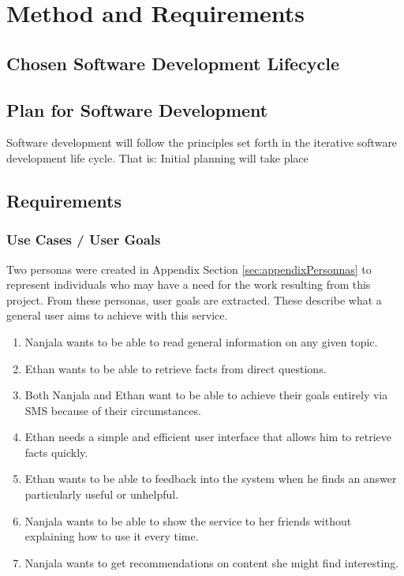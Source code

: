 \documentclass{article}
\begin{document}
\newpage
\section{Method and Requirements}
\label{sec:method}

\subsection{Chosen Software Development Lifecycle}

\subsection{Plan for Software Development}
Software development will follow the principles set forth in the iterative software development life cycle.  That is: Initial planning will take place 

\subsection{Requirements}

\subsubsection{Use Cases / User Goals}
Two personas were created in Appendix Section \ref{sec:appendixPersonnas} to represent individuals who may have a need for the work resulting from this project.  From these personas, user goals are extracted.  These describe what a general user aims to achieve with this service.
\begin{enumerate}
  \item Nanjala wants to be able to read general information on any given topic.
  \item Ethan wants to be able to retrieve facts from direct questions.
  \item Both Nanjala and Ethan want to be able to achieve their goals entirely via SMS because of their circumstances.
  \item Ethan needs a simple and efficient user interface that allows him to retrieve facts quickly. 
  \item Ethan wants to be able to feedback into the system when he finds an answer particularly useful or unhelpful. 
  \item Nanjala wants to be able to show the service to her friends without explaining how to use it every time.
  \item Nanjala wants to get recommendations on content she might find interesting. 
\end{enumerate}
\end{document}
